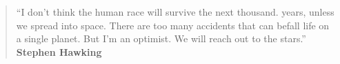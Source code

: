 
\begin{quote}
    ``I don't think the human race will survive the next thousand. years, unless we spread into space. There are too many accidents that can befall life on a single planet. But I'm an optimist. We will reach out to the stars.'' 
    \\
    \hspace*{\fill}\textbf{Stephen Hawking}
\end{quote}
